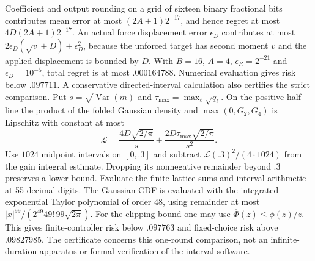 \documentclass[12pt,a4paper]{article}
\newcommand{\Var}{\operatorname{Var}}
\begin{document}
Coefficient and output rounding on a grid of sixteen binary
fractional bits contributes mean error at most $(2A+1)2^{-17}$,
and hence regret at most $4D(2A+1)2^{-17}$.
An actual force displacement error $\epsilon_D$ contributes at most
$2\epsilon_D(\sqrt v+D)+\epsilon_D^2$, because the unforced target
has second moment $v$ and the applied displacement is bounded by $D$.
With $B=16$, $A=4$, $\epsilon_R=2^{-21}$ and
$\epsilon_D=10^{-5}$, total regret is at most $.000164788$.
Numerical evaluation gives risk below $.097711$.
A conservative directed-interval calculation also certifies the strict
comparison. Put $s=\sqrt{\Var(m)}$ and $\tau_{\max}=\max_\ell\sqrt{q_\ell}$.
On the positive half-line the product of the folded Gaussian density
and $\max(0,G_2,G_4)$ is Lipschitz with constant at most
\[
 \mathcal L=
 \frac{4D\sqrt{2/\pi}}{s}
 +\frac{2D\tau_{\max}\sqrt{2/\pi}}{s^2}.
\]
Use $1024$ midpoint intervals on $[0,.3]$ and subtract
$\mathcal L(.3)^2/(4\cdot1024)$ from the gain integral estimate.
Dropping its nonnegative remainder beyond $.3$ preserves a lower
bound. Evaluate the finite lattice sums and interval arithmetic at
55 decimal digits. The Gaussian CDF is evaluated with the integrated
exponential Taylor polynomial of order $48$, using remainder at most
$|x|^{99}/(2^{49}49!\,99\sqrt{2\pi})$.
For the clipping bound one may use
$\overline\Phi(z)\leq\phi(z)/z$.
This gives finite-controller risk below $.097763$ and fixed-choice
risk above $.09827985$. The certificate concerns this one-round
comparison, not an infinite-duration apparatus or formal verification
of the interval software.
\end{document}
